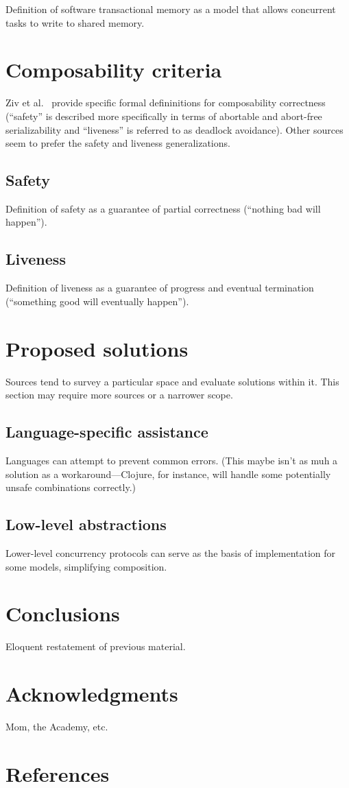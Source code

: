 \documentclass{sig-alternate}
\begin{document}
Definition of software transactional memory as a model that allows concurrent tasks to write to shared memory.

\section{Composability criteria}

Ziv et al.~\cite{Ziv2015} provide specific formal defininitions for composability correctness (``safety'' is described more specifically in terms of abortable and abort-free serializability and ``liveness'' is referred to as deadlock avoidance). Other sources seem to prefer the safety and liveness generalizations.

\subsection{Safety}

Definition of safety as a guarantee of partial correctness (``nothing bad will happen'').

\subsection{Liveness}

Definition of liveness as a guarantee of progress and eventual termination (``something good will eventually happen'').

\section{Proposed solutions}

Sources tend to survey a particular space and evaluate solutions within it. This section may require more sources or a narrower scope.

\subsection{Language-specific assistance}

Languages can attempt to prevent common errors. (This maybe isn't as muh a solution as a workaround---Clojure, for instance, will handle some potentially unsafe combinations correctly.)

\subsection{Low-level abstractions}

Lower-level concurrency protocols can serve as the basis of implementation for some models, simplifying composition.

\section{Conclusions}

Eloquent restatement of previous material.

\section{Acknowledgments}

Mom, the Academy, etc.

\section{References}

\nocite{*}

\printbibliography[heading=none]
\end{document}
